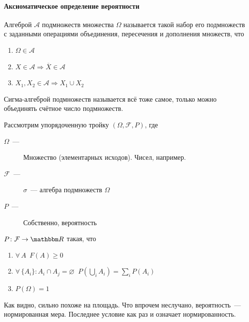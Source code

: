 \documentclass[12pt,hardcopy]{../../../notes}
\begin{document}
\paragraph{Аксиоматическое определение вероятности}
\label{par:prob::ax}

\begin{defn}\label{defn:prob::ax::sigmalg}
  Алгеброй $\mathcal A$ подмножеств множества $\Omega$ называется такой набор его подмножеств с
  заданными операциями объединения, пересечения и дополнения множеств, что
  \begin{enumerate}
    \item $\Omega \in \mathcal A$
    \item $X\in \mathcal A \Rightarrow \overline{X} \in \mathcal A$
    \item $X_1, X_2 \in \mathcal A \Rightarrow X_1 \cup X_2$
  \end{enumerate}

  Сигма-алгеброй подмножеств называется всё тоже самое, только можно объединять счётное число
  подмножеств.
\end{defn}
\begin{defn}\label{defn:prob::ax::probspace}
  Рассмотрим упорядоченную тройку $(\Omega, \mathcal F, P)$, где
  \begin{description}
    \item[$\Omega$~---] Множество (элементарных исходов). Чисел, например.
    \item[$\mathcal F$~---] $\sigma$~--- алгебра подмножеств $\Omega$
    \item[$P$~---] Собственно, вероятность
  \end{description}
\end{defn}

\begin{defn}[Вероятность]\label{defn:prob::ax::probdef}
  $P\colon \mathcal F \to \R$ такая, что
  \begin{enumerate}
    \item $\forall\, A\;\: F(A) \geqslant 0$
    \item $\forall\, \{A_i\}\colon A_i \cap A_j = \varnothing 
      \;\; P\left(\bigcup_i A_i\right) = \sum_i P(A_i)$
    \item $P(\Omega) = 1$
  \end{enumerate}
  Как видно, сильно похоже на площадь. Что впрочем неслучано, вероятность~--- нормированная мера.
  Последнее условие как раз и означает нормированность. 
\end{defn}
\end{document}
